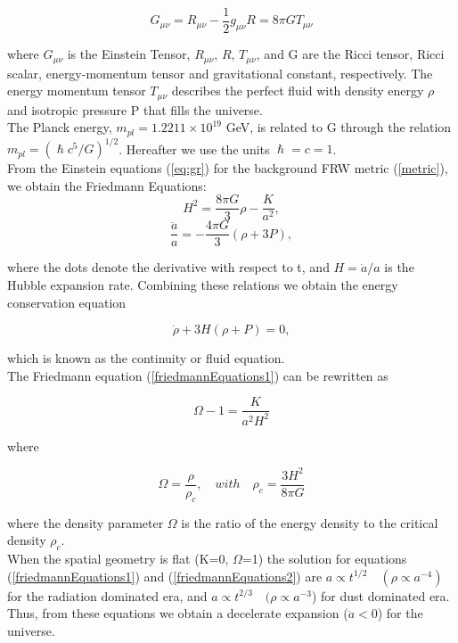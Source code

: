 \documentclass[11pt,a4paper,twoside]{book}
\begin{document}
\begin{equation}
	\label{eq:gr}
	G_{\mu\nu}  = R_{\mu\nu} - \frac{1}{2}g_{\mu\nu}R=8\pi G T_{\mu\nu}
\end{equation}

where $ G_{\mu\nu} $ is the Einstein Tensor, $ R_{\mu\nu} $, $ R $, $ T_{\mu\nu}$, and G are the Ricci tensor, Ricci scalar, energy-momentum tensor and gravitational constant, respectively. The energy momentum tensor $ T_{\mu\nu} $ describes the perfect fluid with density energy $ \rho $ and isotropic pressure P that fills the universe.\\
The Planck energy, $m_{pl}=1.2211 \times 10^{19}$ GeV, is related to G through the relation $ m_{pl} = (\hslash c^{5}/G)^{1/2}$. Hereafter we use the units $ \hslash = c = 1 $.\\
From the Einstein equations (\ref{eq:gr}) for the background FRW metric (\ref{metric}), we obtain the Friedmann Equations:
\begin{equation}
	\label{friedmannEquations1}
	H^{2}=\frac{8\pi G}{3}\rho - \frac{K}{a^{2}},
\end{equation}
\begin{equation}
	\label{friedmannEquations2}	
	\frac{\ddot{a}}{a} = -\frac{4\pi G}{3}(\rho + 3P),
\end{equation}

where the dots denote the derivative with respect to t, and $ H=\dot{a}/a $ is the Hubble expansion rate. Combining these relations we obtain the energy conservation equation 

\begin{equation}
	\label{energyCons}
	\dot{\rho} + 3H(\rho + P)=0,
\end{equation}

which is known as the continuity or fluid equation.\\
The Friedmann equation (\ref{friedmannEquations1}) can be rewritten as 

\begin{equation}
	\label{densityParameter}
	\Omega - 1 = \frac{K}{a^{2}H^{2}}
\end{equation}

where 

\begin{equation}
	\label{criticalDensity}
	\Omega=\frac{\rho}{\rho_{c}}, \quad    with \quad   \rho_{c}=\frac{3H^{2}}{8\pi G}
\end{equation}

where the density parameter $ \Omega $ is the ratio of the energy density to the critical density $ \rho_{c} $.\\
When the spatial geometry is flat (K=0, $ \Omega $=1) the solution for equations (\ref{friedmannEquations1})
and (\ref{friedmannEquations2}) are $ a \propto t^{1/2} \quad  (\rho \propto a^{-4}) $ for the radiation dominated era, and $ a\propto t^{2/3} \quad  (  \rho \propto  a^{-3}$) for dust dominated era.\\
Thus, from these equations we obtain a decelerate expansion ($ \ddot{a} < 0 $) for the universe.\\
\end{document}
